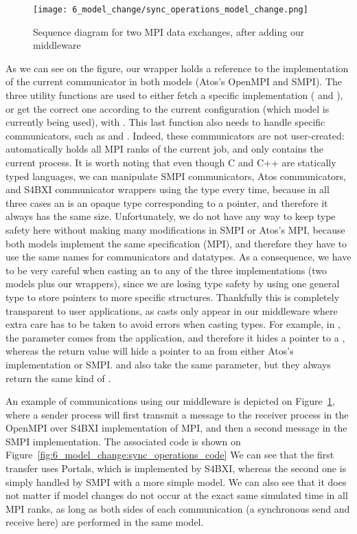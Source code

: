 \begin{figure}[!b]
    \centering
    \texttt{[image: 6\_model\_change/sync\_operations\_model\_change.png]}
    \caption{Sequence diagram for two MPI data exchanges, after adding our middleware}
    \label{fig:6_model_change:sync_operations}
\end{figure}

As we can see on the figure, our wrapper holds a reference to the implementation
of the current communicator in both models (Atos's OpenMPI and SMPI). The three
utility functions are used to either fetch a specific implementation
( and ), or get the correct one according to
the current configuration (which model is currently being used), with
. This last function also needs to handle specific
communicators, such as  and .
Indeed, these communicators are not user-created: 
automatically holds all MPI ranks of the current job, and 
only contains the current process. It is worth noting that even though C and C++
are statically typed languages, we can manipulate SMPI communicators, Atos
communicators, and S4BXI communicator wrappers using the type 
every time, because in all three cases an  is an opaque type
corresponding to a pointer, and therefore it always has the same size.
Unfortunately, we do not have any way to keep type safety here without making
many modifications in SMPI or Atos's MPI, because both models implement the same
specification (MPI), and therefore they have to use the same names for
communicators and datatypes. As a consequence, we have to be very careful when
casting an  to any of the three implementations (two models
plus our wrappers), since we are losing type safety by using one general type to
store pointers to more specific structures. Thankfully this is completely
transparent to user applications, as casts only appear in our middleware where
extra care has to be taken to avoid errors when casting types. For example, in
, the parameter  comes from the
application, and therefore it hides a pointer to a , whereas
the return value will hide a pointer to an  from either Atos's
implementation or SMPI.  and  also take the
same parameter, but they always return the same kind of .

An example of communications using our middleware is depicted on
Figure~\ref{fig:6_model_change:sync_operations}, where a sender process will
first transmit a message to the receiver process in the OpenMPI over S4BXI
implementation of MPI, and then a second message in the SMPI implementation. The
associated code is shown on Figure~\ref{fig:6_model_change:sync_operations_code}
We can see that the first transfer uses Portals, which is implemented by S4BXI,
whereas the second one is simply handled by SMPI with a more simple model. We
can also see that it does not matter if model changes do not occur at the exact
same simulated time in all MPI ranks, as long as both sides of each
communication (a synchronous send and receive here) are performed in the same
model.

